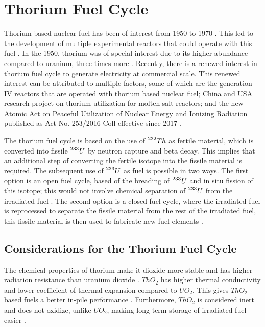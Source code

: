 \chapter{Thorium Fuel Cycle}

Thorium based nuclear fuel has been of interest from 1950 to 1970 \cite{Th_cycle_viability}. This led to the development of multiple experimental reactors that could operate with this fuel \cite{TMSR_book}. In the 1950, thorium was of special interest due to its higher abundance compared to uranium, three times more \cite{Th_cycle_viability,TMSR_book}. Recently, there is a renewed interest in thorium fuel cycle to generate electricity at commercial scale. This renewed interest can be attributed to multiple factors, some of which are the generation IV reactors that are operated with thorium based nuclear fuel; China and USA research project on thorium utilization for molten salt reactors; and the new Atomic Act on Peaceful Utilization of Nuclear Energy and Ionizing Radiation published as Act No. 253/2016 Coll effective since 2017 \cite{Th_cycle_viability}.     

The thorium fuel cycle is based on the use of \(\prescript{232}{}{Th}\) as fertile material, which is converted into fissile \(\prescript{233}{}{U}\) by neutron capture and beta decay. This implies that an additional step of converting the fertile isotope into the fissile material is required. The subsequent use of \(\prescript{233}{}{U}\) as fuel is possible in two ways. The first option is an open fuel cycle, based of the breading of \(\prescript{233}{}{U}\) and in situ fission of this isotope; this would not involve chemical separation of \(\prescript{233}{}{U}\) from the irradiated fuel \cite{IAEA_Th_Potential}. The second option is a closed fuel cycle, where the irradiated fuel is reprocessed to separate the fissile material from the rest of the irradiated fuel, this fissile material is then used to fabricate new fuel elements \cite{IAEA_Th_Potential}. 

\section{Considerations for the Thorium Fuel Cycle}

The chemical properties of thorium make it dioxide more stable and has higher radiation resistance than uranium dioxide \cite{IAEA_Th_Potential}. \(ThO_2\) has higher thermal conductivity and lower coefficient of thermal expansion compared to \(UO_2\). This gives \(ThO_2\) based fuels a better in-pile performance \cite{IAEA_Th_Potential}. Furthermore, \(ThO_2\) is considered inert and does not oxidize, unlike \(UO_2\), making long term storage of irradiated fuel easier \cite{IAEA_Th_Potential}.

